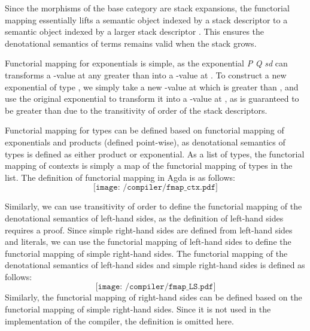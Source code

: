 \documentclass[12pt,a4paper]{report}
\theoremstyle{definition}
\begin{document}
    Since the morphisms of the base category \text{\Upsigma} are stack expansions, the functorial mapping essentially lifts a semantic object indexed by a stack descriptor  to a semantic object indexed by a larger stack descriptor . This ensures the denotational semantics of terms remains valid when the stack grows.

    Functorial mapping for exponentials is simple, as the exponential \textit{P}  \textit{Q} \textit{sd} can transforms a -value at any  greater than  into a -value at . To construct a new exponential of type , we simply take a new -value at  which is greater than , and use the original exponential to transform it into a -value at , as  is guaranteed to be greater than  due to the transitivity of order of the stack descriptors. 

    Functorial mapping for types can be defined based on functorial mapping of exponentials and products (defined point-wise), as denotational semantics of types is defined as either product or exponential. As a list of types, the functorial mapping of contexts is simply a map of the functorial mapping of types in the list. The definition of functorial mapping in Agda is as follows:
    \[\texttt{[image: /compiler/fmap\_ctx.pdf]}\]

    Similarly, we can use transitivity of order to define the functorial mapping of the denotational semantics of left-hand sides, as the definition of left-hand sides requires a proof. Since simple right-hand sides are defined from left-hand sides and literals, we can use the functorial mapping of left-hand sides to define the functorial mapping of simple right-hand sides. The functorial mapping of the denotational semantics of left-hand sides and simple right-hand sides is defined as follows:
    \[\texttt{[image: /compiler/fmap\_LS.pdf]}\]
    Similarly, the functorial mapping of right-hand sides can be defined based on the functorial mapping of simple right-hand sides. Since it is not used in the implementation of the compiler, the definition is omitted here.
\end{document}
